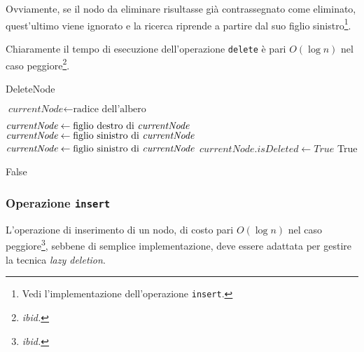 \documentclass[10pt,a4paper,titlepage]{article}
\begin{document}
Ovviamente, se il nodo da eliminare risultasse già contrassegnato come eliminato, quest'ultimo viene ignorato e la ricerca riprende a partire dal suo figlio sinistro\footnote{Vedi l'implementazione dell'operazione \texttt{insert}.}.

Chiaramente il tempo di esecuzione dell'operazione \texttt{delete} è pari $O(\log n)$ nel caso peggiore\footnote{\textit{ibid.}}.

\begin{center}
\begin{algorithm}
\caption{DeleteNode}\label{alg:testb}
\begin{algorithmic}[1]

\State $\textit{currentNode} \gets \text{radice dell'albero}$


	\State $\textit{currentNode} \gets \text{figlio destro di \textit{currentNode}}$
	\State $\textit{currentNode} \gets \text{figlio sinistro di \textit{currentNode}}$
\Else 
 		\State $\textit{currentNode} \gets \text{figlio sinistro di \textit{currentNode}}$
 	\Else 	
 		\State $\textit{currentNode.isDeleted} \gets True$ 
 		\State \Return True
 		
\EndIf
\EndIf
\EndWhile

\State \Return False

\EndFunction
\end{algorithmic}
\end{algorithm}
\end{center}

\newpage
\subsubsection{Operazione \texttt{insert}}

L'operazione di inserimento di un nodo, di costo pari $O(\log n)$ nel caso peggiore\footnote{\textit{ibid.}}, sebbene di semplice implementazione, deve essere adattata per gestire la tecnica \textit{lazy deletion}.
\end{document}
